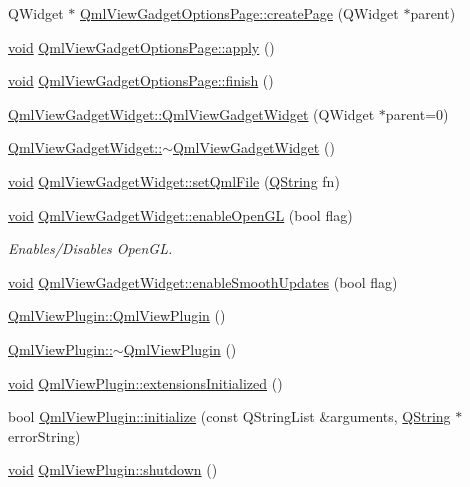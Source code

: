 \begin{DoxyCompactItemize}
\item 
Q\-Widget $\ast$ \hyperlink{group___o_p_map_plugin_gabea978f47d48fc92ec7e5a0ed8d88fe0}{Qml\-View\-Gadget\-Options\-Page\-::create\-Page} (Q\-Widget $\ast$parent)
\item 
\hyperlink{group___u_a_v_objects_plugin_ga444cf2ff3f0ecbe028adce838d373f5c}{void} \hyperlink{group___o_p_map_plugin_gae54bde0f44f72b28df2d9722d829d930}{Qml\-View\-Gadget\-Options\-Page\-::apply} ()
\item 
\hyperlink{group___u_a_v_objects_plugin_ga444cf2ff3f0ecbe028adce838d373f5c}{void} \hyperlink{group___o_p_map_plugin_ga8730978634b18a85389188571ad7fec5}{Qml\-View\-Gadget\-Options\-Page\-::finish} ()
\item 
\hyperlink{group___o_p_map_plugin_ga5f276e99396b6fdc55b2809358cdc036}{Qml\-View\-Gadget\-Widget\-::\-Qml\-View\-Gadget\-Widget} (Q\-Widget $\ast$parent=0)
\item 
\hyperlink{group___o_p_map_plugin_gab474fe9554896c3815e74bd3979a54a9}{Qml\-View\-Gadget\-Widget\-::$\sim$\-Qml\-View\-Gadget\-Widget} ()
\item 
\hyperlink{group___u_a_v_objects_plugin_ga444cf2ff3f0ecbe028adce838d373f5c}{void} \hyperlink{group___o_p_map_plugin_gadd4680d8e3dc82c1a2fc6812c609535d}{Qml\-View\-Gadget\-Widget\-::set\-Qml\-File} (\hyperlink{group___u_a_v_objects_plugin_gab9d252f49c333c94a72f97ce3105a32d}{Q\-String} fn)
\item 
\hyperlink{group___u_a_v_objects_plugin_ga444cf2ff3f0ecbe028adce838d373f5c}{void} \hyperlink{group___o_p_map_plugin_gae8d1d0bb3f42b7107492b4e146544e5d}{Qml\-View\-Gadget\-Widget\-::enable\-Open\-G\-L} (bool flag)
\begin{DoxyCompactList}\small\item\em Enables/\-Disables Open\-G\-L. \end{DoxyCompactList}\item 
\hyperlink{group___u_a_v_objects_plugin_ga444cf2ff3f0ecbe028adce838d373f5c}{void} \hyperlink{group___o_p_map_plugin_ga6c243c31f5bf4653f0bbd7b10527beb3}{Qml\-View\-Gadget\-Widget\-::enable\-Smooth\-Updates} (bool flag)
\item 
\hyperlink{group___o_p_map_plugin_ga1276ad345027c9b33c40edc2e447dd98}{Qml\-View\-Plugin\-::\-Qml\-View\-Plugin} ()
\item 
\hyperlink{group___o_p_map_plugin_gab669bd345bdb7a755f4f767edf44f5fc}{Qml\-View\-Plugin\-::$\sim$\-Qml\-View\-Plugin} ()
\item 
\hyperlink{group___u_a_v_objects_plugin_ga444cf2ff3f0ecbe028adce838d373f5c}{void} \hyperlink{group___o_p_map_plugin_ga36fa5cb525a31c9b6877a3da80262f69}{Qml\-View\-Plugin\-::extensions\-Initialized} ()
\item 
bool \hyperlink{group___o_p_map_plugin_ga07810591116e8f592fca15a0fe4e3b1d}{Qml\-View\-Plugin\-::initialize} (const Q\-String\-List \&arguments, \hyperlink{group___u_a_v_objects_plugin_gab9d252f49c333c94a72f97ce3105a32d}{Q\-String} $\ast$error\-String)
\item 
\hyperlink{group___u_a_v_objects_plugin_ga444cf2ff3f0ecbe028adce838d373f5c}{void} \hyperlink{group___o_p_map_plugin_ga181dc94c5cc23521ffde448715c6ad8e}{Qml\-View\-Plugin\-::shutdown} ()
\end{DoxyCompactItemize}
